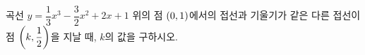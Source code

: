 곡선 $y=\dfrac{1}{3}x^3-\dfrac{3}{2}x^2+2x+1$ 위의 점 $(0{,}\mkern3mu\mathopen{}1)$에서의 접선과 기울기가 같은 다른 접선이 점 $\left(k{,}\mkern3mu\mathopen{}\dfrac{1}{2}\right)$을 지날 때, $k$의 값을 구하시오.
